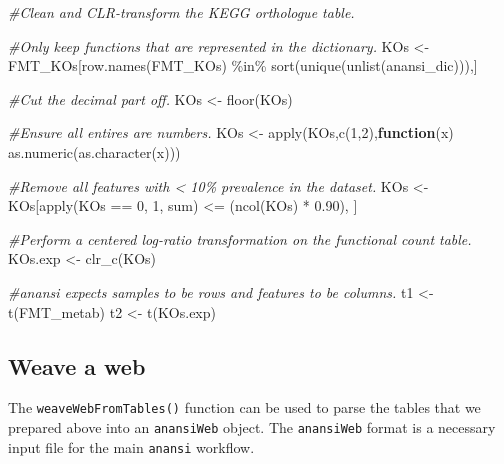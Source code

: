 \documentclass[
]{article}
\newenvironment{Shaded}{\begin{snugshade}}{\end{snugshade}}
\newcommand{\CommentTok}[1]{\textcolor[rgb]{0.56,0.35,0.01}{\textit{#1}}}
\newcommand{\ControlFlowTok}[1]{\textcolor[rgb]{0.13,0.29,0.53}{\textbf{#1}}}
\newcommand{\DecValTok}[1]{\textcolor[rgb]{0.00,0.00,0.81}{#1}}
\newcommand{\FloatTok}[1]{\textcolor[rgb]{0.00,0.00,0.81}{#1}}
\newcommand{\FunctionTok}[1]{\textcolor[rgb]{0.00,0.00,0.00}{#1}}
\newcommand{\NormalTok}[1]{#1}
\newcommand{\OtherTok}[1]{\textcolor[rgb]{0.56,0.35,0.01}{#1}}
\newcommand{\SpecialCharTok}[1]{\textcolor[rgb]{0.00,0.00,0.00}{#1}}
\begin{document}
\begin{Shaded}
\begin{Highlighting}[]
\CommentTok{\#Clean and CLR{-}transform the KEGG orthologue table.}

\CommentTok{\#Only keep functions that are represented in the dictionary.}
\NormalTok{KOs     }\OtherTok{\textless{}{-}}\NormalTok{ FMT\_KOs[}\FunctionTok{row.names}\NormalTok{(FMT\_KOs) }\SpecialCharTok{\%in\%} \FunctionTok{sort}\NormalTok{(}\FunctionTok{unique}\NormalTok{(}\FunctionTok{unlist}\NormalTok{(anansi\_dic))),]}

\CommentTok{\#Cut the decimal part off.}
\NormalTok{KOs     }\OtherTok{\textless{}{-}} \FunctionTok{floor}\NormalTok{(KOs)}

\CommentTok{\#Ensure all entires are numbers.}
\NormalTok{KOs     }\OtherTok{\textless{}{-}} \FunctionTok{apply}\NormalTok{(KOs,}\FunctionTok{c}\NormalTok{(}\DecValTok{1}\NormalTok{,}\DecValTok{2}\NormalTok{),}\ControlFlowTok{function}\NormalTok{(x) }\FunctionTok{as.numeric}\NormalTok{(}\FunctionTok{as.character}\NormalTok{(x)))}

\CommentTok{\#Remove all features with \textless{} 10\% prevalence in the dataset.}
\NormalTok{KOs     }\OtherTok{\textless{}{-}}\NormalTok{ KOs[}\FunctionTok{apply}\NormalTok{(KOs }\SpecialCharTok{==} \DecValTok{0}\NormalTok{, }\DecValTok{1}\NormalTok{, sum) }\SpecialCharTok{\textless{}=}\NormalTok{ (}\FunctionTok{ncol}\NormalTok{(KOs) }\SpecialCharTok{*} \FloatTok{0.90}\NormalTok{), ] }

\CommentTok{\#Perform a centered log{-}ratio transformation on the functional count table.}
\NormalTok{KOs.exp }\OtherTok{\textless{}{-}} \FunctionTok{clr\_c}\NormalTok{(KOs)}

\CommentTok{\#anansi expects samples to be rows and features to be columns. }
\NormalTok{t1      }\OtherTok{\textless{}{-}} \FunctionTok{t}\NormalTok{(FMT\_metab)}
\NormalTok{t2      }\OtherTok{\textless{}{-}} \FunctionTok{t}\NormalTok{(KOs.exp)}
\end{Highlighting}
\end{Shaded}

\hypertarget{weave-a-web}{%
\subsection{Weave a web}\label{weave-a-web}}

The \texttt{weaveWebFromTables()} function can be used to parse the
tables that we prepared above into an \texttt{anansiWeb} object. The
\texttt{anansiWeb} format is a necessary input file for the main
\texttt{anansi} workflow.
\end{document}
